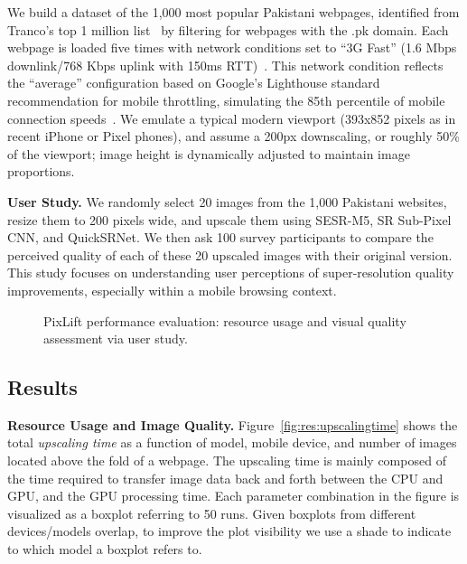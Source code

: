 \documentclass[acmsmall]{acmart}
\newcommand{\tool}{{PixLift}\xspace}
\begin{document}
We build a dataset of the 1,000  most popular Pakistani webpages, identified from Tranco's top 1 million list~\cite{tranco} by filtering for webpages with the .pk domain. Each webpage is loaded five times with network conditions set to ``3G Fast'' (1.6 Mbps downlink/768 Kbps uplink with 150ms RTT)~\cite{3G_Fast}. This network condition reflects the ``average'' configuration based on Google's Lighthouse standard recommendation for mobile throttling, simulating the 85th percentile of mobile connection speeds~\cite{3G_Fast}. We emulate a typical modern viewport (393x852 pixels as in recent iPhone or Pixel phones), and assume a 200px downscaling, or roughly 50\% of the viewport; image height is dynamically adjusted to maintain image proportions. 

\vspace{0.05in}
\noindent
\textbf{User Study.} We randomly select 20 images from the 1,000 Pakistani websites, resize them to 200 pixels wide, and upscale them using SESR-M5, SR Sub-Pixel CNN, and QuickSRNet. We then ask 100 survey participants to compare the perceived quality of each of these 20 upscaled images with their original version. This study focuses on understanding user perceptions of super-resolution quality improvements, especially within a mobile browsing context.


\begin{figure*}[!htbp]
    \centering
    \caption{\tool performance evaluation: resource usage and visual quality assessment via user study.}
    \label{fig:res2}
\end{figure*}


\subsection{Results}

\vspace{0.05in}
\noindent
\textbf{Resource Usage and Image Quality.}
Figure~\ref{fig:res:upscalingtime} shows the total \textit{upscaling time} as a function of model, mobile device, and number of images located above the fold of a webpage. The upscaling time is mainly composed of the time required to transfer image data back and forth between the CPU and GPU, and the GPU processing time.  Each parameter combination in the figure is visualized as a boxplot referring to 50 runs. Given boxplots from different devices/models overlap, to improve the plot visibility we use a shade to indicate to which model a boxplot refers to. 
\end{document}
